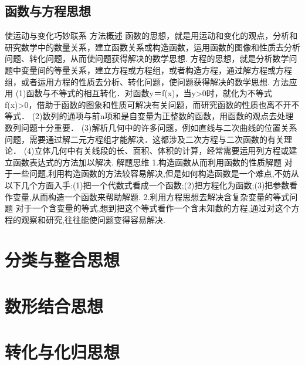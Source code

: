   \subsection{函数与方程思想}
    使运动与变化巧妙联系
    方法概述
    函数的思想，就是用运动和变化的观点，分析和研究数学中的数量关系，建立函数关系或构造函数，运用函数的图像和性质去分析问题、转化问题，从而使问题获得解决的数学思想.
    方程的思想，就是分析数学问题中变量间的等量关系，建立方程或方程组，或者构造方程，通过解方程或方程组，或者运用方程的性质去分析、转化问题，使问题获得解决的数学思想.
    方法应用
    (1)函数与不等式的相互转化．对函数y＝f(x)，当y>0时，就化为不等式f(x)>0，借助于函数的图象和性质可解决有关问题，而研究函数的性质也离不开不等式．
    (2)数列的通项与前n项和是自变量为正整数的函数，用函数的观点去处理数列问题十分重要．
    (3)解析几何中的许多问题，例如直线与二次曲线的位置关系问题，需要通过解二元方程组才能解决．这都涉及二次方程与二次函数的有关理论．
    (4)立体几何中有关线段的长、面积、体积的计算，经常需要运用列方程或建立函数表达式的方法加以解决.
    解题思维
    1.构造函数从而利用函数的性质解题
    对于一些问题,利用构造函数的方法较容易解决,但是如何构造函数是一个难点,不妨从以下几个方面入手:(1)把一个代数式看成一个函数;(2)把方程化为函数;(3)把参数看作变量,从而构造一个函数来帮助解题.
    2.利用方程思想去解决含复杂变量的等式问题
    对于一个含变量的等式,想到把这个等式看作一个含未知数的方程,通过对这个方程的观察和研究,往往能使问题变得容易解决.
\section{分类与整合思想}
\section{数形结合思想}
\section{转化与化归思想}
